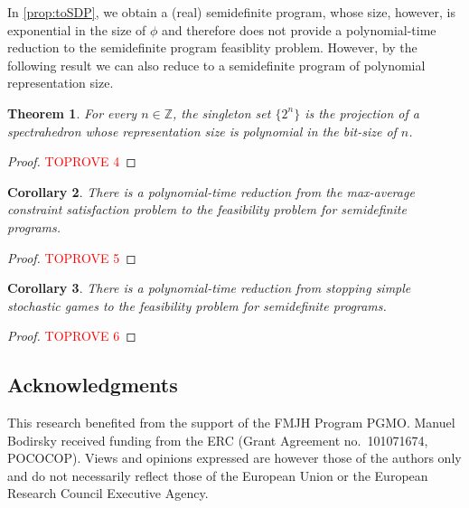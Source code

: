 \documentclass[11pt]{article}
\newtheorem{theorem}{Theorem}[section]
\newtheorem{corollary}[theorem]{Corollary}
\theoremstyle{definition}
\theoremstyle{remark}
\begin{document}
In \cref{prop:toSDP}, we obtain a (real) semidefinite program, whose size, however, is exponential in the size of $\phi$ and therefore does not provide a polynomial-time reduction to the semidefinite program feasiblity problem. However, by the following result we can also reduce to
a semidefinite program of polynomial representation size. 


\begin{theorem}\label{thm:large-constants}
    For every $n \in {\mathbb Z}$, the singleton set $\{2^{n}\}$ is the projection of a spectrahedron whose representation size is polynomial in the bit-size of $n$. 
\end{theorem}
\begin{proof}\textcolor{red}{TOPROVE 4}\end{proof}

\begin{corollary}\label{cor:MaxAv-SDP}
    There is a polynomial-time reduction from the max-average constraint satisfaction problem to the feasibility problem for semidefinite programs. 
\end{corollary}
\begin{proof}\textcolor{red}{TOPROVE 5}\end{proof}

\begin{corollary}
    There is a polynomial-time reduction from stopping simple stochastic games to the feasibility problem for semidefinite programs. 
\end{corollary}
\begin{proof}\textcolor{red}{TOPROVE 6}\end{proof}

\subsection*{Acknowledgments}
This research benefited from the support of the FMJH Program PGMO.
Manuel Bodirsky received funding from the ERC (Grant Agreement no.\ 101071674, POCOCOP). Views and opinions expressed are however those of the authors only and do not necessarily reflect those of the European Union or the European Research Council Executive Agency.



\end{document}

